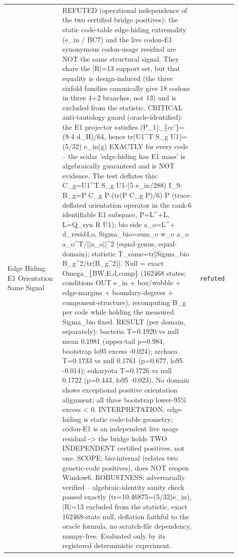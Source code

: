 \begin{longtable}{>{\raggedright\arraybackslash}p{0.22\linewidth}>{\raggedright\arraybackslash}p{0.55\linewidth}>{\raggedright\arraybackslash}p{0.15\linewidth}}
Edge Hiding E1 Orientation Same Signal & REFUTED (operational independence of the two certified bridge positives): the static code-table edge-hiding extremality (e\_in / BC7) and the live codon-E1 synonymous codon-usage residual are NOT the same structural signal. They share the |R|=13 support set, but that equality is design-induced (the three sixfold families canonically give 18 codons in three 4+2 branches, not 13) and is excluded from the statistic. CRITICAL anti-tautology guard (oracle-identified): the E1 projector satisfies (P\_1)\_\{cc'\}=(9-4 d\_H)/64, hence tr(U1\textasciicircum{}T S\_g U1)=(5/32) e\_in(g) EXACTLY for every code -- the scalar 'edge-hiding has E1 mass' is algebraically guaranteed and is NOT evidence. The test deflates this: C\_g=U1\textasciicircum{}T S\_g U1-(5 e\_in/288) I\_9; B\_g=P C\_g P-(tr(P C\_g P)/6) P (trace-deflated orientation operator in the rank-6 identifiable E1 subspace, P=L\textasciicircum{}+L, L=Q\_syn R U1); bio side a\_o=L\textasciicircum{}+ d\_resid4,o, Sigma\_bio=sum\_o w\_o a\_o a\_o\textasciicircum{}T/||a\_o||\textasciicircum{}2 (equal-genus, equal-domain); statistic T\_same=tr[Sigma\_bio B\_g\textasciicircum{}2/tr(B\_g\textasciicircum{}2)]. Null = exact Omega\_\{BW,E,d,comp\} (162468 states; conditions OUT e\_in + box/wobble + edge-margins + boundary-degrees + component-structure), recomputing B\_g per code while holding the measured Sigma\_bio fixed. RESULT (per domain, separately): bacteria T=0.1920 vs null mean 0.1981 (upper-tail p=0.984, bootstrap lo95 excess -0.024); archaea T=0.1733 vs null 0.1761 (p=0.677, lo95 -0.014); eukaryota T=0.1726 vs null 0.1722 (p=0.443, lo95 -0.023). No domain shows exceptional positive orientation alignment; all three bootstrap lower-95\% excess < 0. INTERPRETATION: edge-hiding is static code-table geometry; codon-E1 is an independent live usage residual -> the bridge holds TWO INDEPENDENT certified positives, not one. SCOPE: bio-internal (relates two genetic-code positives), does NOT reopen Window6. ROBUSTNESS: adversarially verified -- algebraic-identity sanity check passed exactly (tr=10.46875=(5/32)e\_in), |R|=13 excluded from the statistic, exact 162468-state null, deflation faithful to the oracle formula, no scratch-file dependency, numpy-free. Evaluated only by its registered deterministic experiment. & \texttt{refuted} \\

\end{longtable}
